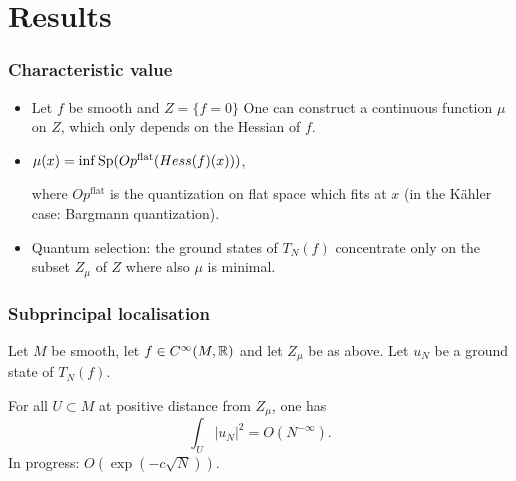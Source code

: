 \documentclass[mathserif]{beamer}
\begin{document}

\section{Results}
\begin{frame}
  \frametitle{Characteristic value}
  \begin{itemize}
  \item Let $f$ be smooth and $Z=\{f=0\}$ One can construct a continuous function $\mu$ on $Z$, which only depends on the Hessian of $f$.
  \item $\mu(x)=\inf \operatorname{Sp}(Op^{\text{flat}}(Hess(f)(x)))$,

    where $Op^{\text{flat}}$ is the quantization on flat space which
    fits at $x$ (in the Kähler case: Bargmann quantization).
  \item<2-> {\color{myorange} Quantum selection}: the ground states of $T_N(f)$
    concentrate only on the subset $Z_{\mu}$ of $Z$ where also $\mu$ is minimal.
  \end{itemize}

\end{frame}

\begin{frame}
  \frametitle{Subprincipal localisation}
  \begin{theorem}[(Deleporte 17)]
    Let $M$ be smooth, let $f\in C^{\infty}(M,\mathbb{R})$ and let $Z_{\mu}$
    be as above. Let $u_N$ be a ground state of $T_N(f)$.

    For all $U\subset M$ at positive distance from $Z_{\mu}$, one has
    \[
      \int_U
      |u_N|^2=O(N^{-\infty}).
    \]
    In progress: $O(\exp(-c\sqrt{N}))$.
  \end{theorem}
\end{frame}
\end{document}
